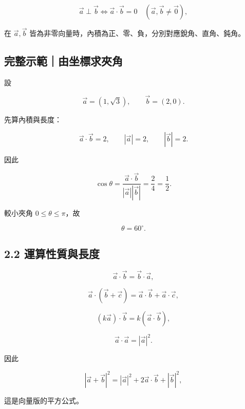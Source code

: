\documentclass[11pt,a4paper]{article}
\begin{document}
\[
\vec a\perp\vec b
\iff
\vec a\cdot\vec b=0
\quad(\vec a,\vec b\ne\vec0),
\]

在 \(\vec a,\vec b\) 皆為非零向量時，內積為正、零、負，分別對應銳角、直角、鈍角。

\begin{HandoutWorkedExample}

\subsection{完整示範｜由坐標求夾角}\label{ux5b8cux6574ux793aux7bc4ux7531ux5750ux6a19ux6c42ux593eux89d2}

設

\[
\vec a=(1,\sqrt3),
\qquad
\vec b=(2,0).
\]

先算內積與長度：

\[
\vec a\cdot\vec b=2,
\qquad
|\vec a|=2,
\qquad
|\vec b|=2.
\]

因此

\[
\cos\theta
=\frac{\vec a\cdot\vec b}{|\vec a||\vec b|}
=\frac{2}{4}
=\frac12.
\]

較小夾角 \(0\le\theta\le\pi\)，故

\[
\boxed{\theta=60^\circ}.
\]

\end{HandoutWorkedExample}

\subsection{2.2 運算性質與長度}\label{ux904bux7b97ux6027ux8ceaux8207ux9577ux5ea6}

\[
\vec a\cdot\vec b=\vec b\cdot\vec a,
\]

\[
\vec a\cdot(\vec b+\vec c)
=\vec a\cdot\vec b+\vec a\cdot\vec c,
\]

\[
(k\vec a)\cdot\vec b
=k(\vec a\cdot\vec b),
\]

\[
\vec a\cdot\vec a=|\vec a|^2.
\]

因此

\[
|\vec a+\vec b|^2
=|\vec a|^2+2\vec a\cdot\vec b+|\vec b|^2,
\]

這是向量版的平方公式。
\end{document}

